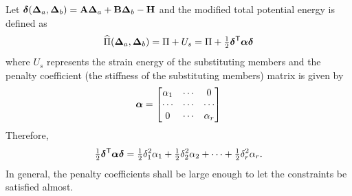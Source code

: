 \begin{fig}
  
\end{fig}
Let $\bm{\delta}(\bm{\Delta}_a, \bm{\Delta}_b) = \mathbf{A}\bm{\Delta}_a + \mathbf{B}\bm{\Delta}_b - \mathbf{H}$ and the modified total potential energy is defined as
\begin{equation}
  \widehat\Pi(\bm{\Delta}_a, \bm{\Delta}_b) = \Pi + U_s = \Pi + \tfrac12\bm{\delta}^{\mathsf{T}}\bm{\alpha}\bm{\delta}
\end{equation}
where $U_s$ represents the strain energy of the substituting members and the penalty coefficient (the stiffness of the substituting members) matrix is given by
\begin{equation*}
  \bm{\alpha} = \begin{bmatrix}\alpha_1 & \cdots & 0\\ \cdots & \cdots & \cdots\\ 0 & \cdots & \alpha_r\end{bmatrix}
\end{equation*}
Therefore,
\begin{equation*}
  \tfrac12\bm{\delta}^{\mathsf{T}}\bm{\alpha}\bm{\delta} = \tfrac12\delta_1^2\alpha_1 + \tfrac12\delta_2^2\alpha_2 + \dots + \tfrac12\delta_r^2\alpha_r.
\end{equation*}
In general, the penalty coefficients shall be large enough to let the constraints be satisfied almost.

